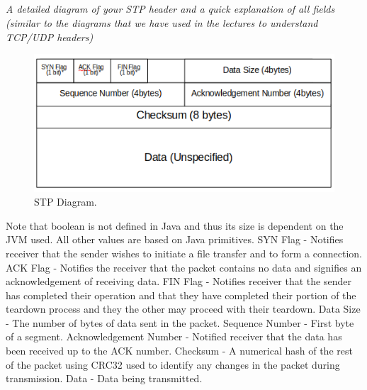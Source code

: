 \documentclass[12pt]{article}
\begin{document}
\subsection{}
\textit{ A detailed diagram of your STP header and a quick explanation of all fields (similar to the diagrams that we have used in the lectures to understand TCP/UDP headers)}
\newline 
\begin{figure}
  \includegraphics[width=\linewidth]{stp-datagram.png}
  \caption{STP Diagram.}
\end{figure}
\newline * Note that boolean is not defined in Java and thus its size is dependent on the JVM used. All other values are based on Java primitives.
\newline SYN Flag - Notifies receiver that the sender wishes to initiate a file transfer and to form a connection.
\newline ACK Flag - Notifies the receiver that the packet contains no data and signifies an acknowledgement of receiving data.
\newline FIN Flag - Notifies receiver that the sender has completed their operation and that they have completed their portion of the teardown process and they the other may proceed with their teardown. 
\newline Data Size - The number of bytes of data sent in the packet.
\newline Sequence Number - First byte of a segment.
\newline Acknowledgement Number - Notified receiver that the data has been received up to the ACK number.
\newline Checksum - A numerical hash of the rest of the packet using CRC32 used to identify any changes in the packet during transmission.
\newline Data - Data being transmitted.
\end{document}
